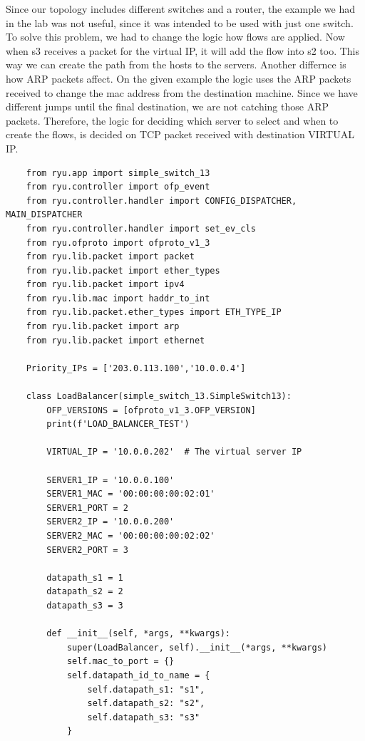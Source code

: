 \documentclass[a4paper,12pt]{article}
\begin{document}
Since our topology includes different switches and a router, the example we had in the lab was not useful, since it was intended to be used with just one switch.
To solve this problem, we had to change the logic how flows are applied. Now when s3 receives a packet for the virtual IP, it will add the flow into s2 too. This way we can create the path from the hosts to the servers.
Another differnce is how ARP packets affect. On the given example the logic uses the ARP packets received to change the mac address from the destination machine. Since we have different jumps until the final destination, we are not catching those ARP packets. Therefore, the logic for deciding which server to select and when to create the flows, is decided on TCP packet received with destination VIRTUAL IP.

\begin{verbatim}
    from ryu.app import simple_switch_13
    from ryu.controller import ofp_event
    from ryu.controller.handler import CONFIG_DISPATCHER, MAIN_DISPATCHER
    from ryu.controller.handler import set_ev_cls
    from ryu.ofproto import ofproto_v1_3
    from ryu.lib.packet import packet
    from ryu.lib.packet import ether_types
    from ryu.lib.packet import ipv4
    from ryu.lib.mac import haddr_to_int
    from ryu.lib.packet.ether_types import ETH_TYPE_IP
    from ryu.lib.packet import arp
    from ryu.lib.packet import ethernet
    
    Priority_IPs = ['203.0.113.100','10.0.0.4']
    
    class LoadBalancer(simple_switch_13.SimpleSwitch13):
        OFP_VERSIONS = [ofproto_v1_3.OFP_VERSION]
        print(f'LOAD_BALANCER_TEST')
    
        VIRTUAL_IP = '10.0.0.202'  # The virtual server IP
    
        SERVER1_IP = '10.0.0.100'
        SERVER1_MAC = '00:00:00:00:02:01'
        SERVER1_PORT = 2
        SERVER2_IP = '10.0.0.200'
        SERVER2_MAC = '00:00:00:00:02:02'
        SERVER2_PORT = 3
    
        datapath_s1 = 1
        datapath_s2 = 2
        datapath_s3 = 3
    
        def __init__(self, *args, **kwargs):
            super(LoadBalancer, self).__init__(*args, **kwargs)
            self.mac_to_port = {}
            self.datapath_id_to_name = {
                self.datapath_s1: "s1",
                self.datapath_s2: "s2",
                self.datapath_s3: "s3"
            }
    

\end{verbatim}
\end{document}
